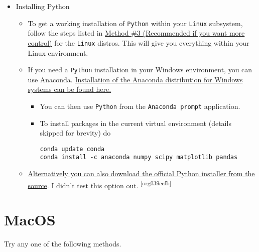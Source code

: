 \documentclass[11pt]{article}
\begin{document}
\begin{itemize}
\item Installing Python
\label{sec:org29b0aa0}

\begin{itemize}
\item To get a working installation of \texttt{Python} within your \texttt{Linux} subsystem, follow
the steps listed in \hyperref[sec:org601761b]{Method \#3 (Recommended if you want more control)} for the
\texttt{Linux} distros. This will give you everything within your Linux environment.
\item If you need a \texttt{Python} installation in your Windows environment, you can use
Anaconda. \href{https://www.anaconda.com/download/\#windows}{Installation of the Anaconda distribution for Windows systems can be found here.}
\begin{itemize}
\item You can then use \texttt{Python} from the \texttt{Anaconda prompt} application.
\item To install packages in the current virtual environment (details skipped for
brevity) do
\begin{verbatim}
conda update conda
conda install -c anaconda numpy scipy matplotlib pandas
\end{verbatim}
\end{itemize}
\item \href{https://www.python.org/downloads/windows/}{Alternatively you can also download the official Python installer from the source}. I
didn't test this option out. \textsuperscript{\ref{org039ccfb}}
\end{itemize}
\end{itemize}

\section*{MacOS}
\label{sec:orgd126048}
Try any one of the following methods.
\end{document}

